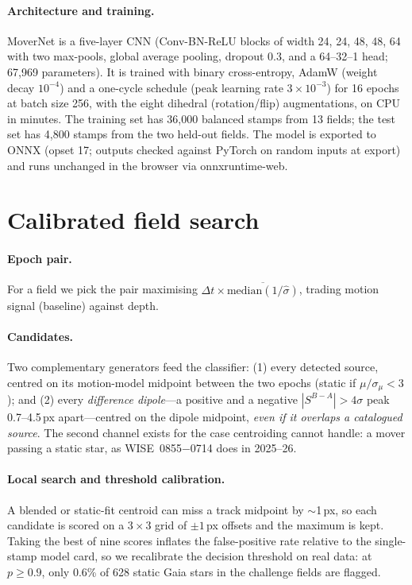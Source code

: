 \documentclass[10pt,twocolumn]{article}
\newcommand{\wise}{WISE~0855$-$0714}
\begin{document}
\paragraph{Architecture and training.} MoverNet is a five-layer CNN (Conv-BN-ReLU blocks of width
24, 24, 48, 48, 64 with two max-pools, global average pooling, dropout 0.3, and a 64--32--1 head;
67{,}969 parameters). It is trained with binary cross-entropy, AdamW (weight decay $10^{-4}$) and a
one-cycle schedule (peak learning rate $3\times10^{-3}$) for 16 epochs at batch size 256, with the eight
dihedral (rotation/flip) augmentations, on CPU in minutes. The training set has 36{,}000 balanced stamps from
13 fields; the test set has 4{,}800 stamps from the two held-out fields. The model is exported to ONNX
(opset 17; outputs checked against PyTorch on random inputs at export) and runs unchanged in the
browser via onnxruntime-web.

\section{Calibrated field search}
\label{sec:candidates}

\paragraph{Epoch pair.} For a field we pick the pair maximising
$\Delta t \times \overline{\mathrm{median}(1/\hat\sigma)}$, trading motion signal (baseline) against depth.

\paragraph{Candidates.} Two complementary generators feed the classifier: (1) every detected source,
centred on its motion-model midpoint between the two epochs (static if $\mu/\sigma_\mu<3$); and
(2) every \emph{difference dipole}---a positive and a negative $|S^{B-A}|>4\sigma$ peak 0.7--4.5\,px
apart---centred on the dipole midpoint, \emph{even if it overlaps a catalogued source}. The second channel
exists for the case centroiding cannot handle: a mover passing a static star, as \wise{} does in 2025--26.

\paragraph{Local search and threshold calibration.} A blended or static-fit centroid can miss a track
midpoint by $\sim$1\,px, so each candidate is scored on a $3\times3$ grid of $\pm1$\,px offsets and the
maximum is kept. Taking the best of nine scores inflates the false-positive rate relative to the
single-stamp model card, so we recalibrate the decision threshold on real data: at $p\geq0.9$, only
0.6\% of 628 static Gaia stars in the challenge fields are flagged.
\end{document}
